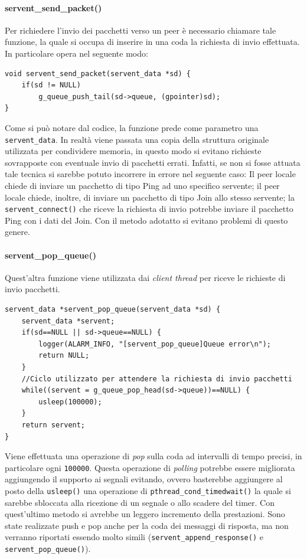 \paragraph{servent\_send\_packet()}
Per richiedere l'invio dei pacchetti verso un peer è necessario chiamare tale funzione, la quale si occupa di inserire in una coda la richiesta di invio effettuata. In particolare opera nel seguente modo:
\begin{lstlisting}[frame=trBL]
void servent_send_packet(servent_data *sd) {
	if(sd != NULL) 
		g_queue_push_tail(sd->queue, (gpointer)sd);
}
\end{lstlisting}
Come si può notare dal codice, la funzione prede come parametro una \texttt{servent\_data}. In realtà viene passata una copia della struttura originale utilizzata per condividere memoria, in questo modo si evitano richieste sovrapposte con eventuale invio di pacchetti errati. Infatti, se non si fosse attuata tale tecnica si sarebbe potuto incorrere in errore nel seguente caso: Il peer locale chiede di inviare un pacchetto di tipo Ping ad uno specifico servente; il peer locale chiede, inoltre, di inviare un pacchetto di tipo Join allo stesso servente; la \texttt{servent\_connect()} che riceve la richiesta di invio potrebbe inviare il pacchetto Ping con i dati del Join. Con il metodo adotatto si evitano problemi di questo genere.
\paragraph{servent\_pop\_queue()}
Quest'altra funzione viene utilizzata dai \textit{client thread} per riceve le richieste di invio pacchetti.
\begin{lstlisting}[frame=trBL]
servent_data *servent_pop_queue(servent_data *sd) {
	servent_data *servent;
	if(sd==NULL || sd->queue==NULL) {
		logger(ALARM_INFO, "[servent_pop_queue]Queue error\n");
		return NULL;
	}
	//Ciclo utilizzato per attendere la richiesta di invio pacchetti
	while((servent = g_queue_pop_head(sd->queue))==NULL) {
		usleep(100000);
	}
	return servent;
}
\end{lstlisting}
Viene effettuata una operazione di \textit{pop} sulla coda ad intervalli di tempo precisi, in particolare ogni \texttt{100000}. Questa operazione di \textit{polling} potrebbe essere migliorata aggiungendo il supporto ai segnali evitando, ovvero basterebbe aggiungere al posto della \texttt{usleep()} una operazione di \texttt{pthread\_cond\_timedwait()} la quale si sarebbe sbloccata alla ricezione di un segnale o allo scadere del timer. Con quest'ultimo metodo si avrebbe un leggero incremento della prestazioni. Sono state realizzate push e pop anche per la coda dei messaggi di risposta, ma non verranno riportati essendo molto simili (\texttt{servent\_append\_response()} e \texttt{servent\_pop\_queue()}).
